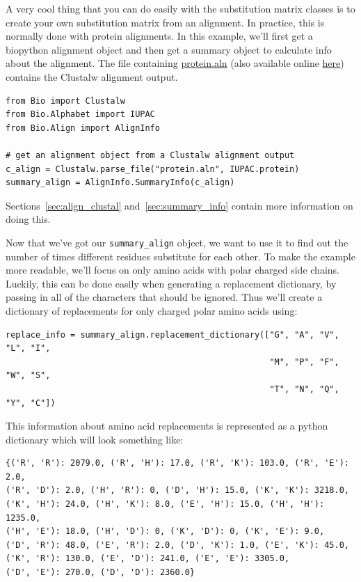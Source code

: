 \documentclass{report}
\begin{document}
A very cool thing that you can do easily with the substitution matrix
classes is to create your own substitution matrix from an
alignment. In practice, this is normally done with protein
alignments. In this example, we'll first get a biopython alignment
object and then get a summary object to calculate info about the
alignment. The file containing \href{examples/protein.aln}{protein.aln}
(also available online
\href{http://biopython.org/DIST/docs/tutorial/examples/protein.aln}{here})
contains the Clustalw alignment output.

\begin{verbatim}
from Bio import Clustalw
from Bio.Alphabet import IUPAC
from Bio.Align import AlignInfo

# get an alignment object from a Clustalw alignment output
c_align = Clustalw.parse_file("protein.aln", IUPAC.protein)
summary_align = AlignInfo.SummaryInfo(c_align)
\end{verbatim}

Sections~\ref{sec:align_clustal} and~\ref{sec:summary_info} contain
more information on doing this.

Now that we've got our \verb|summary_align| object, we want to use it
to find out the number of times different residues substitute for each
other. To make the example more readable, we'll focus on only amino
acids with polar charged side chains. Luckily, this can be done easily
when generating a replacement dictionary, by passing in all of the
characters that should be ignored. Thus we'll create a dictionary of
replacements for only charged polar amino acids using:

\begin{verbatim}
replace_info = summary_align.replacement_dictionary(["G", "A", "V", "L", "I",
                                                     "M", "P", "F", "W", "S",
                                                     "T", "N", "Q", "Y", "C"])
\end{verbatim}

This information about amino acid replacements is represented as a
python dictionary which will look something like:

\begin{verbatim}
{('R', 'R'): 2079.0, ('R', 'H'): 17.0, ('R', 'K'): 103.0, ('R', 'E'): 2.0,
('R', 'D'): 2.0, ('H', 'R'): 0, ('D', 'H'): 15.0, ('K', 'K'): 3218.0,
('K', 'H'): 24.0, ('H', 'K'): 8.0, ('E', 'H'): 15.0, ('H', 'H'): 1235.0,
('H', 'E'): 18.0, ('H', 'D'): 0, ('K', 'D'): 0, ('K', 'E'): 9.0,
('D', 'R'): 48.0, ('E', 'R'): 2.0, ('D', 'K'): 1.0, ('E', 'K'): 45.0,
('K', 'R'): 130.0, ('E', 'D'): 241.0, ('E', 'E'): 3305.0,
('D', 'E'): 270.0, ('D', 'D'): 2360.0}
\end{verbatim}
\end{document}

